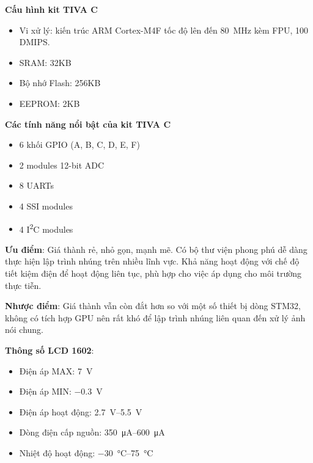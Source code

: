 \textbf{Cấu hình kit TIVA C}
\begin{itemize}
\item Vi xử lý: kiến trúc ARM Cortex-M4F tốc độ lên đến \si{80\MHz} kèm FPU, 100 DMIPS.
\item SRAM: 32KB
\item Bộ nhớ Flash: 256KB
\item EEPROM: 2KB
\end{itemize}

\textbf{Các tính năng nổi bật của kit TIVA C}
\begin{itemize}
\item 6 khối GPIO (A, B, C, D, E, F)
\item 2 modules 12-bit ADC
\item 8 UARTs
\item 4 SSI modules
\item 4 I\textsuperscript{2}C modules
\end{itemize}

\textbf{Ưu điểm}: Giá thành rẻ, nhỏ gọn, mạnh mẽ. Có bộ thư viện phong phú dễ dàng thực hiện lập trình nhúng trên nhiều lĩnh vực.
Khả năng hoạt động với chế độ tiết kiệm điện để hoạt động liên tục, phù hợp cho việc áp dụng cho môi trường thực tiễn.

\textbf{Nhược điểm}: Giá thành vẫn còn đắt hơn so với một số thiết bị dòng STM32, không có tích hợp GPU nên rất khó để lập trình nhúng liên quan đến xử lý ảnh nói chung.

\pagebreak
\textbf{Thông số LCD 1602}:
\begin{itemize}
\item Điện áp MAX: \si{7\volt}
\item Điện áp MIN: \si{\num{-0.3}\volt}
\item Điện áp hoạt động: \SIrange[range-phrase=--, range-units=single]{2.7}{5.5}{\volt}
\item Dòng điện cấp nguồn: \SIrange[range-phrase=--, range-units=single]{350}{600}{\micro\ampere}
\item Nhiệt độ hoạt động: \SIrange[range-phrase=--, range-units=single]{-30}{75}{\celsius}
\end{itemize}

